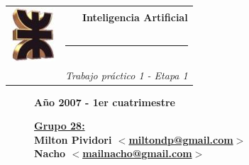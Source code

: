 \thispagestyle{empty}

\begin{center}
\begin{tabular}{cr}
\multirow{3}{*}{ \includegraphics{logoUTN.jpg} }
& \Huge\bfseries Inteligencia Artificial \\
& \noindent\rule[-1ex]{120mm}{4pt} \\
& \\
& \noindent\large\emph{Trabajo práctico 1 - Etapa 1}
\end{tabular}
\end{center}

\begin{figure}[b]
\center\large\textbf{Año 2007 - 1er cuatrimestre}
\normalsize
\linebreak
\begin{flushleft}
\bfseries
\underline{Grupo 28:}\\
Milton Pividori \href{mailto:miltondp@gmail.com}
  {$<$miltondp@gmail.com$>$}\\
Nacho \href{mailto:mailnacho@gmail.com}
  {$<$mailnacho@gmail.com$>$}
\end{flushleft}

\end{figure}
